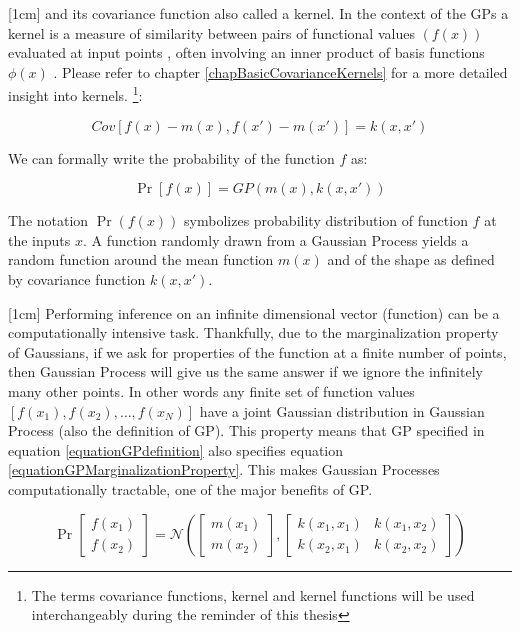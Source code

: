 [1cm]
and its covariance function also called a kernel. In the context of the GPs a kernel is a measure of similarity between pairs of functional values \((f(x))\) evaluated at input points , often involving an inner product of basis functions \(\phi(x)\) \cite{bishop2006pattern}. Please refer to chapter \ref{chapBasicCovarianceKernels} for a more detailed insight into kernels.   \footnote{The terms covariance functions, kernel and kernel functions will be used interchangeably during the reminder of this thesis}:

\begin{equation}\label{eq:covarianceGP}
Cov[f(x) - m(x), f(x') - m(x')] = k(x, x')
\end{equation}

We can formally write the probability of the function \(f\) as:

\begin{equation}\label{equationGPdefinition}
\Pr[f(x)] = GP(m(x), k(x, x'))
\end{equation}

The notation \(\Pr(f( x))\) symbolizes probability distribution of function \(f\) at the inputs \(x\). A function randomly drawn from a Gaussian Process yields a random function around the mean function \(m(x)\) and of the shape as defined by covariance function \(k(x, x')\). 

[1cm]
Performing inference on an infinite dimensional vector (function) can be a computationally intensive task. Thankfully, due to the marginalization property of Gaussians, if we ask for properties of the function at a finite number of points, then  Gaussian Process will give us the same answer if we ignore the infinitely many other points. In other words any finite set of function values \([f(x_{1}), f(x_{2}), \ldots, f(x_{N})]\) have a joint Gaussian distribution in Gaussian Process (also the  definition of GP). This property means that GP specified in equation \ref{equationGPdefinition} also specifies equation \ref{equationGPMarginalizationProperty}. This makes Gaussian Processes computationally tractable, one of the major benefits of GP. 


\begin{equation}\label{equationGPMarginalizationProperty}
\Pr\left [ \begin{matrix}
f(x_{1})
\\ f(x_{2})
\end{matrix} \right ] = \mathcal{N}\left (\left [ \begin{matrix}
m(x_{1})
\\ m(x_{2})

\end{matrix} \right ] , \left [ \begin{matrix}
k(x_{1}, x_{1}) & k(x_{1}, x_{2})\\ 
k(x_{2}, x_{1}) & k(x_{2}, x_{2})
\end{matrix} \right ] \right )
\end{equation}

